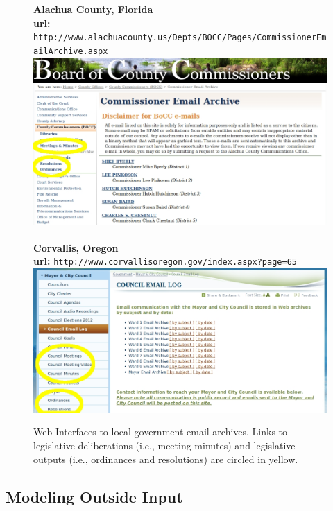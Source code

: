 \begin{figure}
\begin{center}
{\bf Alachua County, Florida} \\
 {\bf url:} \texttt{http://www.alachuacounty.us/Depts/BOCC/Pages/CommissionerEmailArchive.aspx} \\
 \includegraphics[scale=.45]{AlachuaBOCC.jpg} \\~\\
 {\bf Corvallis, Oregon} \\
 {\bf url:} \texttt{http://www.corvallisoregon.gov/index.aspx?page=65} \\
  \includegraphics[scale=.45]{CorvallisOR.jpg}
\end{center}
\caption{Web Interfaces to local government email archives. Links to legislative deliberations (i.e., meeting minutes) and legislative outputs (i.e., ordinances and resolutions) are circled in yellow.}
\end{figure}

\subsection{Modeling Outside Input}

